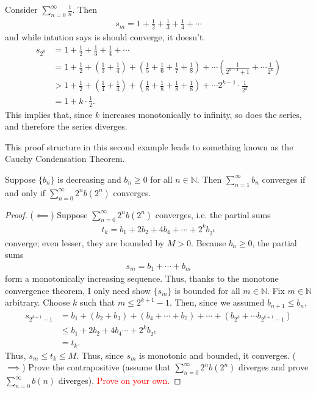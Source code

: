 \documentclass{ximera}
\begin{document}
\begin{example}
    Consider $\sum\limits_{n=0}^\infty \frac1n$.  Then
    \begin{align}
        s_m = 1 + \frac12 + \frac13 + \frac14 + \cdots
    \end{align}
and while intution says is should converge, it doesn't.
\begin{align}
    s_{2^k} &= 1 + \frac12 + \frac13 + \frac14 + \cdots
    \\
    &= 1 + \frac12 + \left(\frac13 + \frac14\right) + \left(\frac15 +\frac16 + \frac17+ \frac18 \right) + \cdots \left(\frac{1}{2^{k-1}+1} + \cdots \frac{1}{2^k}\right)
    \\
    &> 
    1 + \frac12 + \left(\frac14 + \frac14\right) + \left(\frac18 +\frac18 + \frac18+ \frac18 \right) + \cdots 2^{k-1}\cdot \frac{1}{2^k}
    \\
    &= 1 + k\cdot \frac12.
\end{align}
This implies that, since $k$ increases monotonically to infinity, so does the series, and therefore the series diverges.
\end{example}
This proof structure in this second example leads to something known as the Cauchy Condensation Theorem.
\begin{theorem}
    Suppose $\{b_n\}$ is decreasing and $b_n \geq 0$ for all $n \in \mathbb{N}$.  Then $\sum\limits_{n=1}^\infty b_n$ converges if and only if $\sum\limits_{n=0}^\infty 2^nb(2^n)$ converges.
\end{theorem}
\begin{proof}
    ($\impliedby$)  Suppose $\sum\limits_{n=0}^\infty 2^nb(2^n)$ converges, i.e. the partial sums
    \begin{align}
        t_k = b_1 + 2b_2 + 4b_4 + \cdots + 2^kb_{2^k}
    \end{align}
    converge; even lesser, they are bounded by $M > 0$.  Because $b_n \geq 0$, the partial sums
    \begin{align*}
        s_m = b_1 + \cdots + b_m
    \end{align*}
    form a monotonically increasing sequence.  Thus, thanks to the monotone convergence theorem, I only need show $\{s_m\}$ is bounded for all $m \in \mathbb{N}$.  Fix $m \in \mathbb{N}$ arbitrary.  Choose $k$ such that $m \leq 2^{k+1}-1$.  Then, since we assumed $b_{n+1}\leq b_n$,
    \begin{align}
        s_{2^{k+1}-1} &= b_1 + (b_2+b_3) + (b_4+\cdots+b_7) + \cdots + (b_{2^k} + \cdots b_{2^{k+1}-1})
        \\
        &\leq b_1 + 2b_2 + 4b_4 \cdots + 2^kb_{2^k}
        \\&= t_k.
    \end{align}
    Thus, $s_m \leq t_k \leq M$.  Thus, since $s_m$ is monotonic and bounded, it converges.
    ($\implies$) Prove the contrapositive (assume that $\sum\limits_{n=0}^\infty 2^nb(2^n)$ diverges and prove $\sum\limits_{n=0}^\infty b(n)$ diverges). \textcolor{red}{Prove on your own.}
\end{proof}
\end{document}
